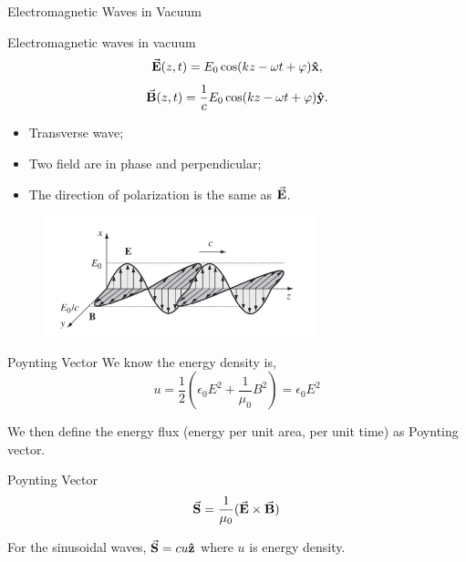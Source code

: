 \documentclass{beamer}
\begin{document}
\begin{frame}{Electromagnetic Waves in Vacuum}
    \begin{block}{Electromagnetic waves in vacuum}
        \begin{equation}
            \va{E}(z, t) = E_0 \cos(kz - \omega t + \varphi) \vu{x},
        \end{equation}
        \begin{equation}
            \va{B}(z, t) = \frac{1}{c}E_0 \cos(kz - \omega t + \varphi) \vu{y}.
        \end{equation}
    \end{block}
    \begin{itemize}
        \item Transverse wave;
        \item Two field are in phase and perpendicular;
        \item The direction of polarization is the same as $\va{E}$.
    \end{itemize}

    \begin{figure}[htbp]
        \centering
        \includegraphics[width=0.7\textwidth]{Images/emwave.jpg}
    \end{figure}
\end{frame}

\begin{frame}{Poynting Vector}
    We know the energy density is,
    \begin{equation}
        u = \frac{1}{2} \left( \epsilon_0 E^2 + \frac{1}{\mu_0} B^2 \right) = \epsilon_0 E^2
    \end{equation}

    We then define the energy flux (energy per unit area, per unit time) as Poynting vector.

    \begin{block}{Poynting Vector}
        \begin{equation}
            \va{S} = \frac{1}{\mu_0} (\va{E} \times \va{B})
        \end{equation}
    \end{block}

    For the sinusoidal waves, $\va{S} = cu \vu{z}$ where $u$ is energy density.
\end{frame}
\end{document}
